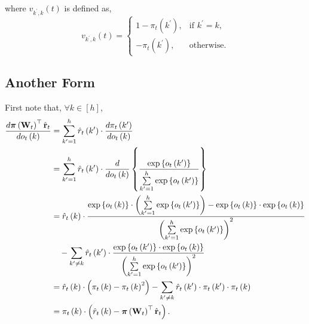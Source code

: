 where $v_{k^\prime,k}(t)$ is defined as,
\begin{equation*}
	v_{k^\prime,k}(t) = \begin{cases}
    1 - \pi_{t}\left(k^\prime\right), & \text{if $k^\prime = k$}, \\
    - \pi_{t}\left(k^\prime\right), & \text{otherwise}.
  \end{cases}
\end{equation*}

\subsection{Another Form}

First note that, $\forall k \in [h]$,
\begin{equation*}
\begin{split}
    \frac{d {\boldsymbol{\pi}}\left( {\mathbf{W}}_t \right)^\top \hat{{\mathbf{r}}}_t}{d o_t\left(k\right)} &= \sum\limits_{k^\prime = 1}^{h}{ \hat{r}_{t}\left(k^\prime\right) \cdot \frac{d \pi_{t}\left(k^\prime\right) }{d o_t\left(k\right)}} \\
    &= \sum\limits_{k^\prime = 1}^{h}{ \hat{r}_{t}\left(k^\prime\right) \cdot \frac{d }{d o_t\left(k\right)}} \left\{ \frac{\exp\left\{ o_{t}\left(k^\prime\right) \right\}}{\sum\limits_{k^\prime = 1}^{h}{\exp\left\{ o_{t}\left(k^\prime\right) \right\}}} \right\} \\
    &= \hat{r}_{t}\left(k\right) \cdot \frac{ \exp\left\{ o_t\left(k\right) \right\} \cdot \left( \sum\limits_{k^\prime = 1}^{h}{\exp\left\{ o_{t}\left(k^\prime\right) \right\}} \right) - \exp\left\{ o_t\left(k\right) \right\} \cdot \exp\left\{ o_t\left(k\right) \right\} }{ \left( \sum\limits_{k^\prime = 1}^{h}{\exp\left\{ o_{t}\left(k^\prime\right) \right\}} \right)^2 } \\
    &\quad - \sum\limits_{k^\prime \not= k}{ \hat{r}_{t}\left(k^\prime\right) \cdot \frac{\exp\left\{ o_{t}\left(k^\prime\right) \right\} \cdot \exp\left\{ o_t\left(k\right) \right\} }{ \left( \sum\limits_{k^\prime = 1}^{h}{\exp\left\{ o_{t}\left(k^\prime\right) \right\}} \right)^2 }} \\
    &= \hat{r}_{t}\left(k\right) \cdot \left( \pi_t\left(k\right) - \pi_t\left(k\right)^2 \right) - \sum\limits_{k^\prime \not= k}{ \hat{r}_{t}\left(k^\prime\right) \cdot \pi_{t}\left(k^\prime\right) \cdot \pi_t\left(k\right) } \\
    &= \pi_t\left(k\right) \cdot \left( \hat{r}_{t}\left(k\right) - {\boldsymbol{\pi}}\left({\mathbf{W}}_t\right)^\top \hat{{\mathbf{r}}}_t \right).
\end{split}
\end{equation*}

